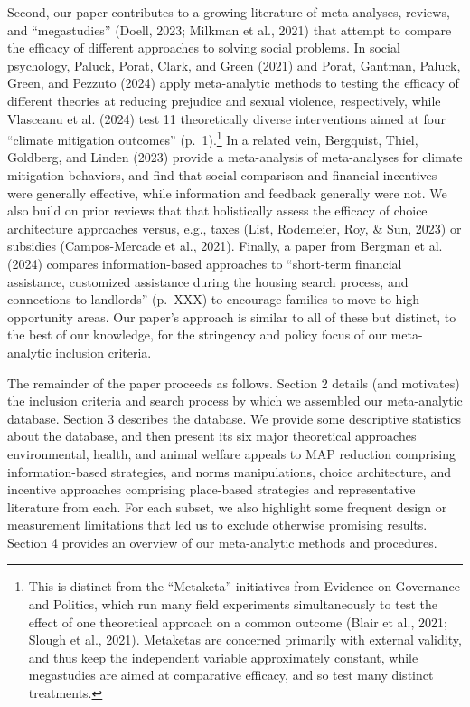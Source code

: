 \documentclass[
  man]{apa6}
\begin{document}
Second, our paper contributes to a growing literature of meta-analyses, reviews, and ``megastudies'' (Doell, 2023; Milkman et al., 2021) that attempt to compare the efficacy of different approaches to solving social problems. In social psychology, Paluck, Porat, Clark, and Green (2021) and Porat, Gantman, Paluck, Green, and Pezzuto (2024) apply meta-analytic methods to testing the efficacy of different theories at reducing prejudice and sexual violence, respectively, while Vlasceanu et al. (2024) test 11 theoretically diverse interventions aimed at four ``climate mitigation outcomes'' (p.~1).\footnote{This is distinct from the ``Metaketa'' initiatives from Evidence on Governance and Politics, which run many field experiments simultaneously to test the effect of one theoretical approach on a common outcome (Blair et al., 2021; Slough et al., 2021). Metaketas are concerned primarily with external validity, and thus keep the independent variable approximately constant, while megastudies are aimed at comparative efficacy, and so test many distinct treatments.} In a related vein, Bergquist, Thiel, Goldberg, and Linden (2023) provide a meta-analysis of meta-analyses for climate mitigation behaviors, and find that social comparison and financial incentives were generally effective, while information and feedback generally were not. We also build on prior reviews that that holistically assess the efficacy of choice architecture approaches versus, e.g., taxes (List, Rodemeier, Roy, \& Sun, 2023) or subsidies (Campos-Mercade et al., 2021). Finally, a paper from Bergman et al. (2024) compares information-based approaches to ``short-term financial assistance, customized assistance during the housing search process, and connections to landlords'' (p.~XXX) to encourage families to move to high-opportunity areas. Our paper's approach is similar to all of these but distinct, to the best of our knowledge, for the stringency and policy focus of our meta-analytic inclusion criteria.

The remainder of the paper proceeds as follows. Section 2 details (and motivates) the inclusion criteria and search process by which we assembled our meta-analytic database. Section 3 describes the database. We provide some descriptive statistics about the database, and then present its six major theoretical approaches \textemdash environmental, health, and animal welfare appeals to MAP reduction comprising information-based strategies, and norms manipulations, choice architecture, and incentive approaches comprising place-based strategies \textemdash and representative literature from each. For each subset, we also highlight some frequent design or measurement limitations that led us to exclude otherwise promising results. Section 4 provides an overview of our meta-analytic methods and procedures.
\end{document}
